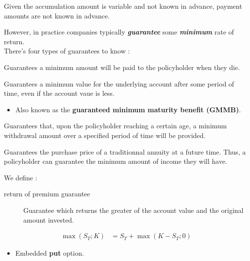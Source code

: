 \documentclass[10pt, french]{article}
\begin{document}
\begin{multicols*}{2}
\begin{definitionNOHFILL}
Given the accumulation amount is variable and not known in advance, payment amounts are not known in advance.
\end{definitionNOHFILL}

However, in practice companies typically \textit{\textbf{guarantee}} some \textit{\textbf{minimum}} rate of return. \\

There's four types of guarantees to know :

\begin{definitionNOHFILLsub}
Guarantees a minimum amount will be paid to the policyholder when they die.
\end{definitionNOHFILLsub}

\begin{definitionNOHFILLsub}
Guarantees a minimum value for the underlying account after some period of time, even if the account vaue is less.

\begin{itemize}
	\item	Also known as the \textbf{guaranteed minimum maturity benefit (GMMB)}.
\end{itemize}
\end{definitionNOHFILLsub}

\begin{definitionNOHFILLsub}
Guarantees that, upon the policyholder reaching a certain age, a minimum withdrawal amount over a specified period of time will be provided.
\end{definitionNOHFILLsub}

\begin{definitionNOHFILLsub}
Guarantees the purchase price of a traditionnal annuity at a future time. Thus, a policyholder can guarantee the minimum amount of income they will have.
\end{definitionNOHFILLsub}

We define : 
\begin{description}
	\item[return of premium guarantee]	Guarantee which returns the greater of the account value and the original amount invested.
\end{description}

\begin{definitionNOHFILLprop}
\begin{align*}
	\max(S_{T}; K)
	&=	S_{T}	+	\max(K	-	S_{T}; 0)
\end{align*}
\begin{itemize}
	\item	Embedded \textbf{put} option.
\end{itemize}
\end{definitionNOHFILLprop}



\end{multicols*}
\end{document}
